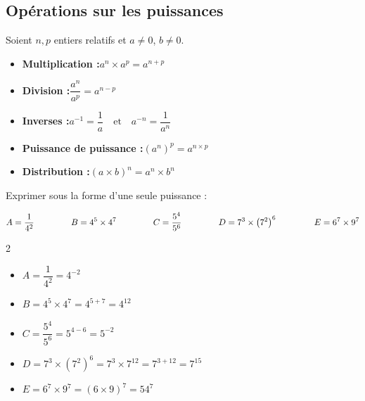\subsection{Opérations sur les puissances}

\begin{prop}
	Soient $n, p$ entiers relatifs et $a \neq 0$, $b \neq 0$.
	\begin{itemize}[itemsep=3mm]
		\item \textbf{Multiplication :}\quad $a^n \times a^p = a^{n+p}$
		\item \textbf{Division :}\quad $\dfrac{a^n}{a^p} = a^{n-p}$
		\item \textbf{Inverses :}\quad $a^{-1} = \dfrac{1}{a} \quad \text{et} \quad a^{-n} = \dfrac{1}{a^n}$
		\item \textbf{Puissance de puissance :}\quad $\left( a^n \right)^p = a^{n \times p}$
		\item \textbf{Distribution :}\quad $(a \times b)^n = a^n \times b^n$
	\end{itemize}
\end{prop}

\begin{exo}
	Exprimer sous la forme d'une seule puissance :

	\[
		A = \frac{1}{4^2} \hspace{15mm} B = 4^5 \times 4^7 \hspace{15mm} C = \frac{5^4}{5^6} \hspace{15mm} D = 7^3 \times \left( 7^2 \right)^6 \hspace{15mm} E = 6^7 \times 9^7
	\]

	\begin{correction}
		\nline
		\begin{multicols}{2}
			\begin{itemize}[itemsep=2mm]
				\item $A = \dfrac{1}{4^2} = 4^{-2}$
				\item $B = 4^5 \times 4^7 = 4^{5+7} = 4^{12}$
				\item $C = \dfrac{5^4}{5^6} = 5^{4-6} = 5^{-2}$
				\item $D = 7^3 \times \left( 7^2 \right)^6 = 7^3 \times 7^{12} = 7^{3+12} = 7^{15}$
				\item $E = 6^7 \times 9^7 = (6 \times 9)^7 = 54^7$
			\end{itemize}
		\end{multicols}
	\end{correction}
\end{exo}

